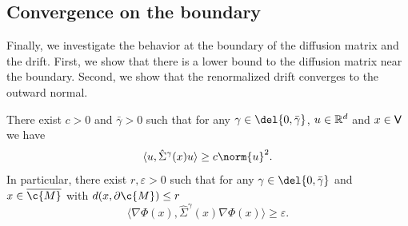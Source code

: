 \subsection{Convergence on the boundary}
\label{sec:convergence_boundary}

Finally, we investigate the behavior at the boundary of the diffusion matrix and the drift.
First, we show that there is a lower bound to the diffusion matrix near the boundary.
Second, we show that the renormalized drift converges to the outward normal.

\begin{proposition}
	\label{prop:condition_duo_iii}
	There exist $c > 0$ and $\bar{\gamma} >0$ such that for any $\gamma \in \del{0, \bar{\gamma}}$, $u \in \mathbb{R}^d$ and $x \in \sf{V}$ we have \begin{equation} \label{eq:lower_bound_diffusion} \langle u, \hat{\Sigma}^\gamma(x) u \rangle \geq c \norm{u}^2 .
	\end{equation}
	In particular, there exist $r, \varepsilon >0$ such that for any $\gamma \in \del{0, \bar{\gamma}}$ and $x \in \cl{\c{M}}$ with $d(x, \partial \c{M}) \leq r$ \begin{equation} \label{eq:lower_boundary} \langle \nabla \Phi(x), \hat{\Sigma}^\gamma(x) \nabla \Phi(x) \rangle \geq \varepsilon .
	\end{equation}
\end{proposition}

